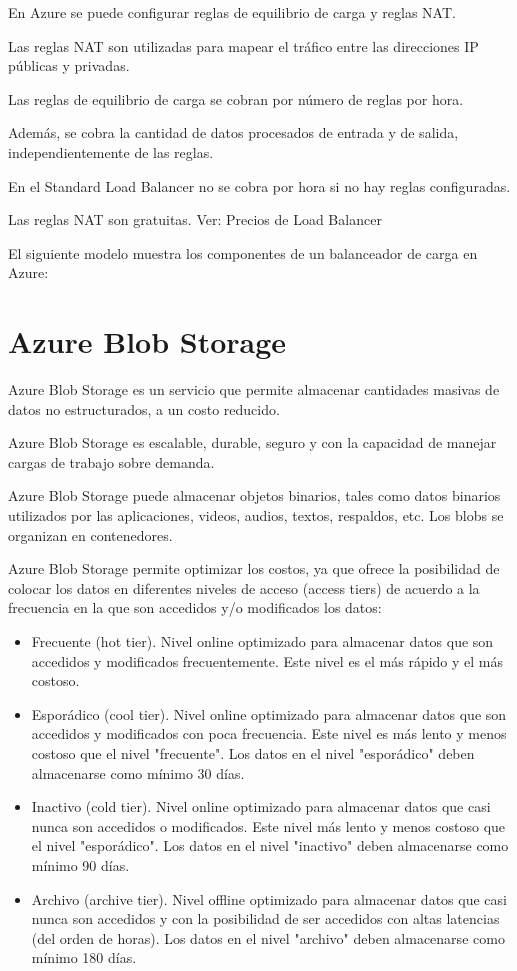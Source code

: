En Azure se puede configurar reglas de equilibrio de carga y reglas NAT.

Las reglas NAT son utilizadas para mapear el tráfico entre las direcciones IP públicas y privadas.

Las reglas de equilibrio de carga se cobran por número de reglas por hora.

Además, se cobra la cantidad de datos procesados de entrada y de salida, independientemente de las reglas.

En el Standard Load Balancer no se cobra por hora si no hay reglas configuradas.

Las reglas NAT son gratuitas. Ver: Precios de Load Balancer

El siguiente modelo muestra los componentes de un balanceador de carga en Azure:

\clearpage


\chapter{Azure Blob Storage}

Azure Blob Storage es un servicio que permite almacenar cantidades masivas de datos no estructurados, a un costo reducido.

Azure Blob Storage es escalable, durable, seguro y con la capacidad de manejar cargas de trabajo sobre demanda.

Azure Blob Storage puede almacenar objetos binarios, tales como datos binarios utilizados por las aplicaciones, videos, audios, textos, respaldos, etc. Los blobs se organizan en contenedores.

Azure Blob Storage permite optimizar los costos, ya que ofrece la posibilidad de colocar los datos en diferentes niveles de acceso (access tiers) de acuerdo a la frecuencia en la que son accedidos y/o modificados los datos:

\begin{itemize}
\item Frecuente (hot tier). Nivel online optimizado para almacenar datos que son accedidos y modificados frecuentemente. Este nivel es el más rápido y el más costoso.
\item Esporádico (cool tier). Nivel online optimizado para almacenar datos que son accedidos y modificados con poca frecuencia. Este nivel es más lento y menos costoso que el nivel "frecuente". Los datos en el nivel "esporádico" deben almacenarse como mínimo 30 días.
\item Inactivo (cold tier). Nivel online optimizado para almacenar datos que casi nunca son accedidos o modificados. Este nivel más lento y menos costoso que el nivel "esporádico". Los datos en el nivel "inactivo" deben almacenarse como mínimo 90 días.
\item Archivo (archive tier). Nivel offline optimizado para almacenar datos que casi nunca son accedidos y con la posibilidad de ser accedidos con altas latencias (del orden de horas). Los datos en el nivel "archivo" deben almacenarse como mínimo 180 días.
\end{itemize}


